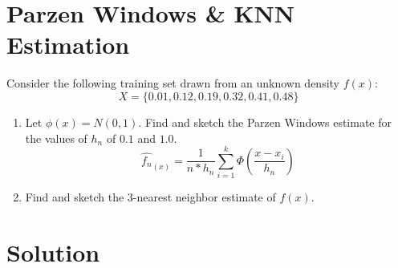 \documentclass[12pt]{article}
\numberwithin{equation}{section}
\numberwithin{table}{section}
\numberwithin{figure}{section}
\begin{document}
\section{Parzen Windows \& KNN Estimation}
Consider the following training set drawn from an unknown density $f(x)$:
$$
	X = \{ 0.01, 0.12, 0.19, 0.32, 0.41, 0.48\}
$$
\begin{enumerate}[label=(\alph*)]
		
	\item	Let $\phi(x) = N(0, 1)$. Find and sketch the Parzen Windows estimate for the values of $h_n$ of $0.1$ and $1.0$.
	\begin{equation}
	\hat{f_n}_{(x)} = \frac{1}{n*h_n} \sum_{i = 1}^{k}\Phi(\frac{x - x_i}{h_n})
	\end{equation}
	
	
	\item Find and sketch the 3-nearest neighbor estimate of $f(x)$.
\end{enumerate}

\section*{Solution}
\end{document}
